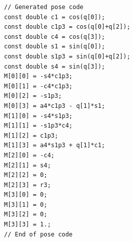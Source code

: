 \documentclass{ecnreport}
\begin{document}
\begin{minipage}{.45\linewidth}
\cppstyle \raggedright
\begin{lstlisting}
// Generated pose code                                                                                                                                                                                                                  
const double c1 = cos(q[0]);                                                                                                                                                                                                            
const double c1p3 = cos(q[0]+q[2]);                                                                                                                                                                                                     
const double c4 = cos(q[3]);                                                                                                                                                                                                            
const double s1 = sin(q[0]);                                                                                                                                                                                                            
const double s1p3 = sin(q[0]+q[2]);                                                                                                                                                                                                     
const double s4 = sin(q[3]);                                                                                                                                                                                                            
M[0][0] = -s4*c1p3;                                                                                                                                                                                                                     
M[0][1] = -c4*c1p3;                                                                                                                                                                                                                     
M[0][2] = -s1p3;                                                                                                                                                                                                                        
M[0][3] = a4*c1p3 - q[1]*s1;                                                                                                                                                                                                            
M[1][0] = -s4*s1p3;
M[1][1] = -s1p3*c4;
M[1][2] = c1p3;
M[1][3] = a4*s1p3 + q[1]*c1;
M[2][0] = -c4;
M[2][1] = s4;
M[2][2] = 0;
M[2][3] = r3;
M[3][0] = 0;
M[3][1] = 0;
M[3][2] = 0;
M[3][3] = 1.;
// End of pose code
\end{lstlisting}
\end{minipage}
\end{document}
